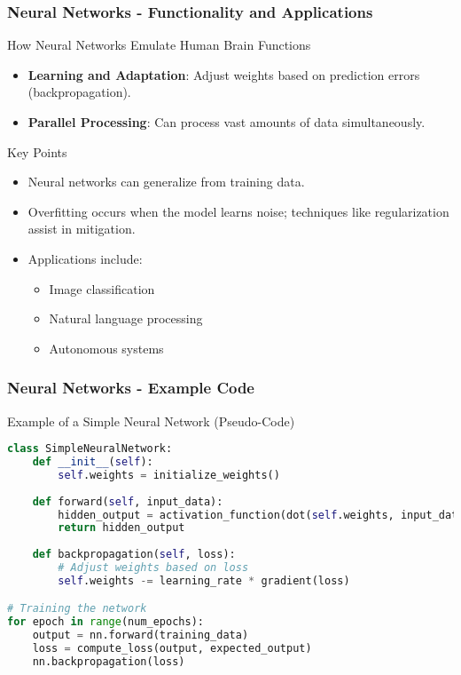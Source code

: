 \documentclass[aspectratio=169]{beamer}
\begin{document}
\begin{frame}[fragile]
    \frametitle{Neural Networks - Functionality and Applications}
    \begin{block}{How Neural Networks Emulate Human Brain Functions}
        \begin{itemize}
            \item \textbf{Learning and Adaptation}: Adjust weights based on prediction errors (backpropagation).
            \item \textbf{Parallel Processing}: Can process vast amounts of data simultaneously.
        \end{itemize}
    \end{block}
    
    \begin{block}{Key Points}
        \begin{itemize}
            \item Neural networks can generalize from training data.
            \item Overfitting occurs when the model learns noise; techniques like regularization assist in mitigation.
            \item Applications include:
            \begin{itemize}
                \item Image classification
                \item Natural language processing
                \item Autonomous systems
            \end{itemize}
        \end{itemize}
    \end{block}
\end{frame}

\begin{frame}[fragile]
    \frametitle{Neural Networks - Example Code}
    \begin{block}{Example of a Simple Neural Network (Pseudo-Code)}
    \begin{lstlisting}[language=Python]
class SimpleNeuralNetwork:
    def __init__(self):
        self.weights = initialize_weights()
    
    def forward(self, input_data):
        hidden_output = activation_function(dot(self.weights, input_data))
        return hidden_output
    
    def backpropagation(self, loss):
        # Adjust weights based on loss
        self.weights -= learning_rate * gradient(loss)

# Training the network
for epoch in range(num_epochs):
    output = nn.forward(training_data)
    loss = compute_loss(output, expected_output)
    nn.backpropagation(loss)
    \end{lstlisting}
    \end{block}
\end{frame}
\end{document}
